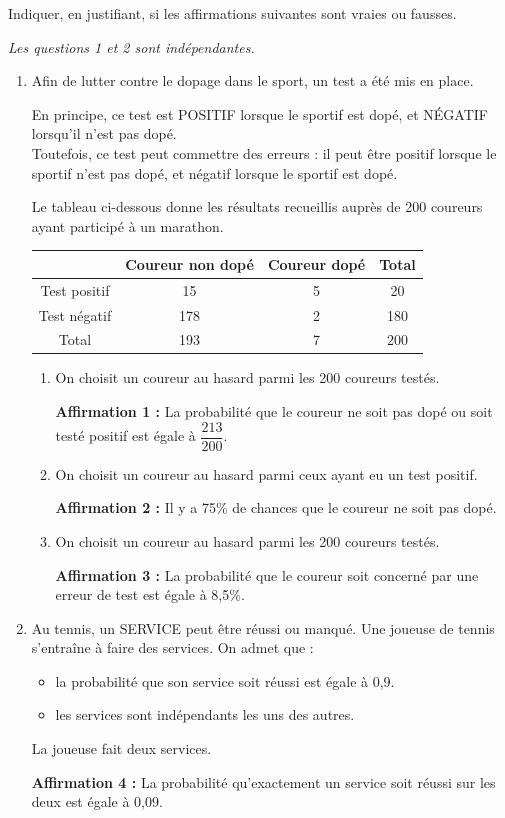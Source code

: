 Indiquer, en justifiant, si les affirmations suivantes sont vraies ou fausses.

\centering \textit{Les questions 1 et 2 sont indépendantes.}

\begin{enumerate}
\item Afin de lutter contre le dopage dans le sport, un test a été mis en place.

En principe, ce test est POSITIF lorsque le sportif est dopé, et NÉGATIF lorsqu'il n'est pas dopé. \\
Toutefois, ce test peut commettre des erreurs : il peut être positif lorsque le sportif n'est pas dopé, et négatif lorsque le sportif est dopé.

Le tableau ci-dessous donne les résultats recueillis auprès de 200 coureurs ayant participé à un marathon.

\begin{center}
\begin{tabular}{|c|c|c|c|}
\hline
 & Coureur non dopé & Coureur dopé & Total \\
\hline
Test positif & 15 & 5 & 20 \\
\hline
Test négatif & 178 & 2 & 180 \\
\hline
Total & 193 & 7 & 200 \\
\hline
\end{tabular}
\end{center}

\begin{enumerate}
\item On choisit un coureur au hasard parmi les 200 coureurs testés.

\textbf{Affirmation 1 :} La probabilité que le coureur ne soit pas dopé ou soit testé positif est égale à $\dfrac{213}{200}$.

\item On choisit un coureur au hasard parmi ceux ayant eu un test positif.

\textbf{Affirmation 2 :} Il y a 75\% de chances que le coureur ne soit pas dopé.

\item On choisit un coureur au hasard parmi les 200 coureurs testés.

\textbf{Affirmation 3 :} La probabilité que le coureur soit concerné par une erreur de test est égale à 8,5\%.
\end{enumerate}

\item Au tennis, un SERVICE peut être réussi ou manqué. Une joueuse de tennis s'entraîne à faire des services. On admet que :
\begin{itemize}
\item la probabilité que son service soit réussi est égale à 0,9.
\item les services sont indépendants les uns des autres.
\end{itemize}

La joueuse fait deux services.

\textbf{Affirmation 4 :} La probabilité qu'exactement un service soit réussi sur les deux est égale à 0,09.
\end{enumerate}
